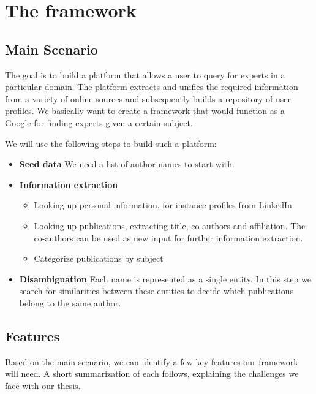 \chapter{The framework}

\section{Main Scenario}

The goal is to build a platform that allows a user to query for experts in a particular domain. The platform extracts and unifies the required information from a variety of online sources and subsequently builds a repository of user profiles. We basically want to create a framework that would function as a Google for finding experts given a certain subject.

We will use the following steps to build such a platform:


\begin{itemize}
	\item \textbf{Seed data} We need a list of author names to start with.
	\item \textbf{Information extraction}
		\begin{itemize}
			\item Looking up personal information, for instance profiles from LinkedIn.
			\item Looking up publications, extracting title, co-authors and affiliation. The co-authors can be used as new input for further information extraction.
			\item Categorize publications by subject
		\end{itemize}
	\item \textbf{Disambiguation} Each name is represented as a single entity. In this step we search for similarities between these entities to decide which publications belong to the same author.
\end{itemize}

\section{Features}

Based on the main scenario, we can identify a few key features our framework will need. A short summarization of each follows, explaining the challenges we face with our thesis.

